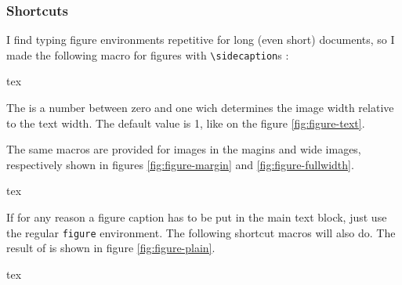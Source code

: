 \documentclass[
	raggedright,
	twoside,
	12pt,
	colorful,
]{tufte-style-article}
\begin{document}


\subsubsection{Shortcuts}

I find typing figure environments repetitive for long (even short) documents, so I made the following macro for figures with \texttt{\textbackslash sidecaption}s :

\begin{codebox}{tex}
\end{codebox}

The  is a number between zero and one wich determines the image width relative to the text width. The default value is 1, like on the figure \ref{fig:figure-text}.

The same macros are provided for images in the magins and wide images, respectively shown in figures \ref{fig:figure-margin} and \ref{fig:figure-fullwidth}.

\begin{codebox}{tex}
\end{codebox}



If for any reason a figure caption has to be put in the main text block, just use the regular \texttt{figure} environment. The following shortcut macros will also do. The result of  is shown in figure \ref{fig:figure-plain}.

\begin{codebox}{tex}
\end{codebox}

\newpage~

\end{document}
